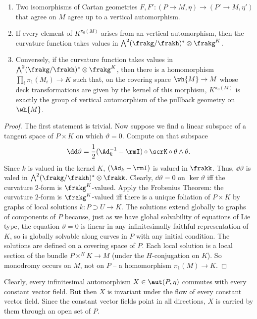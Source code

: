 \begin{cor}
    \begin{enumerate}
        \item Two isomorphisms of Cartan geometries $F,F':(P\to M,\eta)\to (P'\to M,\eta')$ that agree on $M$ agree up to a vertical automorphism.
        \item If every element of $K^{\pi_0(M)}$ arises from an vertical automorphism, then the curvature function takes values in $\bigwedge\nolimits^2(\frakg\slash\frakh)^\ast\otimes\frakg^K$.
        \item Conversely, if the curvature function takes values in $\bigwedge\nolimits^2(\frakg\slash\frakh)^\ast\otimes\frakg^K$, then there is a homomorphism $\prod_i \pi_1(M_i)\to K$ such that, on the covering space $\wh{M}\to M$ whose deck transformations are given by the kernel of this morphism, $K^{\pi_0(M)}$ is exactly the group of vertical automorphism of the pullback geometry on $\wh{M}$.
    \end{enumerate}
\end{cor}
\begin{proof}
    The first statement is trivial. Now suppose we find a linear subspace of a tangent space of $P\times K $  on which $\vartheta=0$. Compute on that subspace 
    \[\dd\vartheta=\frac12(\Ad_k^{-1}-\rmI)\circ \scrK\circ \theta\wedge\theta.\]
    Since $k$ is valued in the kernel $K$, $(\Ad_k-\rmI)$ is valued in $\frakk$. Thus, $\dd\vartheta$ is valed in $\bigwedge\nolimits^2(\frakg\slash\frakh)^\ast\otimes\frakk$. Clearly, $\dd\vartheta=0$ on $\ker\vartheta$ iff the curvature $2$-form is $\frakg^K$-valued. Apply the Frobenius Theorem: the curvature $2$-form is $\frakg^K$-valued iff there is a unique foliation of $P\times K$ by graphs of local solutions $k:P\supset U\to K$. The solutions extend globally to graphs of components of $P$ because, just as we have global solvability of equations of Lie type, the equation $\vartheta=0$ is linear in any infinitesimally faithful representation of $K$, so is globally solvable along curves in $P$ with any initial condition. The solutions are defined on a covering space of $P$. Each local solution is a local section of the bundle $P\times^H K\to M$ (under the $H$-conjugation on $K$). So monodromy occurs on $M$, not on $P$ --  a homomorphism $\pi_1(M)\to K$.
\end{proof}

Clearly, every infinitesimal automorphism $X\in\aut(P,\eta)$ commutes with every constant vector field. But then $X$ is invariant under the flow of every constant vector field. Since the constant vector fields point in all directions, $X$ is carried by them through an open set of $P$.

